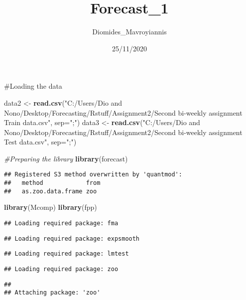 \documentclass[
]{article}
\title{Forecast\_1}
\author{Diomides\_Mavroyiannis}
\date{25/11/2020}
\newenvironment{Shaded}{\begin{snugshade}}{\end{snugshade}}
\newcommand{\CommentTok}[1]{\textcolor[rgb]{0.56,0.35,0.01}{\textit{#1}}}
\newcommand{\DataTypeTok}[1]{\textcolor[rgb]{0.13,0.29,0.53}{#1}}
\newcommand{\KeywordTok}[1]{\textcolor[rgb]{0.13,0.29,0.53}{\textbf{#1}}}
\newcommand{\NormalTok}[1]{#1}
\newcommand{\StringTok}[1]{\textcolor[rgb]{0.31,0.60,0.02}{#1}}
\begin{document}
\maketitle

\#Loading the data

\begin{Shaded}
\begin{Highlighting}[]
\NormalTok{data2 <-}\StringTok{ }\KeywordTok{read.csv}\NormalTok{(}\StringTok{"C:/Users/Dio and Nono/Desktop/Forecasting/Rstuff/Assignment2/Second bi-weekly assignment Train data.csv"}\NormalTok{, }\DataTypeTok{sep=}\StringTok{";"}\NormalTok{)}
\NormalTok{data3 <-}\StringTok{ }\KeywordTok{read.csv}\NormalTok{(}\StringTok{"C:/Users/Dio and Nono/Desktop/Forecasting/Rstuff/Assignment2/Second bi-weekly assignment Test data.csv"}\NormalTok{, }\DataTypeTok{sep=}\StringTok{";"}\NormalTok{)}

\CommentTok{#Preparing the library}
\KeywordTok{library}\NormalTok{(forecast)}
\end{Highlighting}
\end{Shaded}

\begin{verbatim}
## Registered S3 method overwritten by 'quantmod':
##   method            from
##   as.zoo.data.frame zoo
\end{verbatim}

\begin{Shaded}
\begin{Highlighting}[]
\KeywordTok{library}\NormalTok{(Mcomp)}
\KeywordTok{library}\NormalTok{(fpp)}
\end{Highlighting}
\end{Shaded}

\begin{verbatim}
## Loading required package: fma
\end{verbatim}

\begin{verbatim}
## Loading required package: expsmooth
\end{verbatim}

\begin{verbatim}
## Loading required package: lmtest
\end{verbatim}

\begin{verbatim}
## Loading required package: zoo
\end{verbatim}

\begin{verbatim}
## 
## Attaching package: 'zoo'
\end{verbatim}
\end{document}
